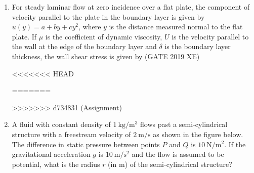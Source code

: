 \documentclass[journal,12pt,onecolumn]{IEEEtran}
\begin{document}
\begin{enumerate}
\item For steady laminar flow at zero incidence over a flat plate, the component of velocity parallel to the plate in the boundary layer is given by $u(y)=a+b y+c y^2$, where $y$ is the distance measured normal to the flat plate. If $\mu$ is the coefficient of dynamic viscosity, $U$ is the velocity parallel to the wall at the edge of the boundary layer and $\delta$ is the boundary layer thickness, the wall shear stress is given by
\hfill{(GATE 2019 XE)} \\
\begin{multicols}{2}
<<<<<<< HEAD
\end{multicols}
=======

\newpage
>>>>>>> d734831 (Assignment)

\item A fluid with constant density of $1\ \mathrm{kg/m^3}$ flows past a semi-cylindrical structure with a freestream velocity of $2\ \mathrm{m/s}$ as shown in the figure below. The difference in static pressure between points $P$ and $Q$ is $10\ \mathrm{N/m^2}$. If the gravitational acceleration $g$ is $10\ \mathrm{m/s^2}$ and the flow is assumed to be potential, what is the radius $r$ (in m) of the semi-cylindrical structure?


\end{enumerate}
\end{document}

